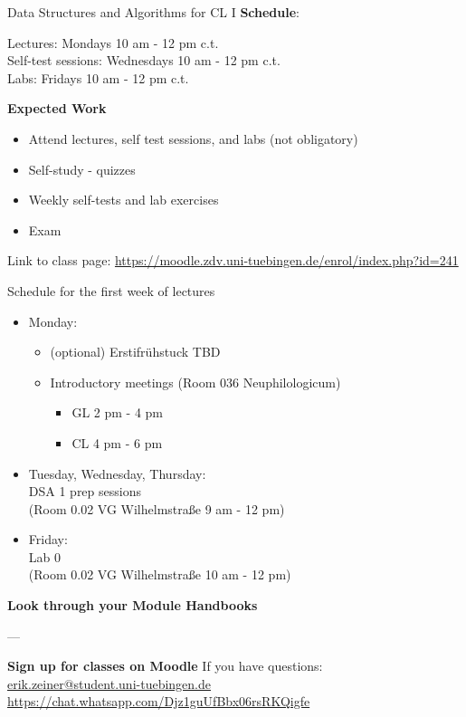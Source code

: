 \documentclass[aspectratio=169,hyperref={unicode},xcolor={dvipsnames}]{beamer}
\begin{document}
\begin{frame}{Data Structures and Algorithms for CL I}
		\textbf{Schedule}:
		
		Lectures: Mondays 10 am - 12 pm c.t.\\
		Self-test sessions: Wednesdays 10 am - 12 pm c.t.\\
		Labs: Fridays 10 am - 12 pm c.t.
			
		\textbf{Expected Work}
		\begin{itemize}
			\item Attend lectures, self test sessions, and labs (not obligatory)
			\item Self-study - quizzes
			\item Weekly self-tests and lab exercises
			\item Exam
		\end{itemize}
		
		\begin{center}
	Link to class page: \url{https://moodle.zdv.uni-tuebingen.de/enrol/index.php?id=241}
\end{center}
\end{frame}

\begin{frame}{Schedule for the first week of lectures}
\begin{itemize}
	\item Monday: 
		\begin{itemize}
		\item (optional) Erstifrühstuck TBD	
		\item Introductory meetings (Room 036 Neuphilologicum)
		\begin{itemize}
			\item GL 2 pm - 4 pm
			\item CL 4 pm - 6 pm
		\end{itemize}
		\end{itemize}
	\item Tuesday, Wednesday, Thursday: \\ DSA 1 prep sessions \\(Room 0.02 VG Wilhelmstraße 9 am - 12 pm)
	\item Friday: \\Lab 0 \\(Room 0.02 VG Wilhelmstraße 10 am - 12 pm)
	
\end{itemize}
\end{frame}
\begin{frame}
\begin{center}
\textbf{Look through your Module Handbooks}

---

\textbf{Sign up for classes on Moodle}
\vfill
		If you have questions: \\ \href{mailto:erik.zeiner@student.uni-tuebingen.de}{erik.zeiner@student.uni-tuebingen.de}
		\\
		\url{https://chat.whatsapp.com/Djz1guUfBbx06rsRKQigfe}
\end{center}
\end{frame}
\end{document}
